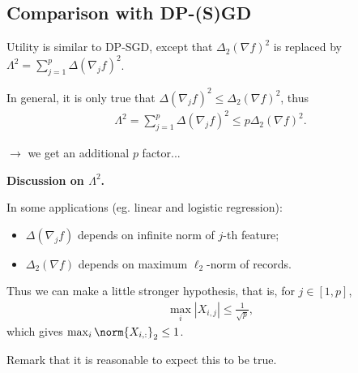 \documentclass[notheorems]{beamer}
\begin{document}
\subsection{Comparison with DP-(S)GD}
\begin{frame}
  Utility is similar to DP-SGD, except that $\Delta_2(\nabla f)^2$ is replaced by $\Lambda^2 = \sum_{j=1}^p \Delta(\nabla_j f)^2$.

  \vspace{1em}

  In general, it is only true that $\Delta(\nabla_j f)^2 \le \Delta_2(\nabla f)^2$, thus
  \begin{align*}
    \Lambda^2 = \sum_{j=1}^p \Delta(\nabla_j f)^2 \le p \Delta_2(\nabla f)^2.
  \end{align*}

  \quad $\rightarrow$ we get an additional $p$ factor...
\end{frame}

\begin{frame}
  \textbf{Discussion on $\Lambda^2$.}

  In some applications (eg. linear and logistic regression):
  \begin{itemize}
  \item $\Delta(\nabla_j f)$ depends on infinite norm of $j$-th feature;
  \item $\Delta_2(\nabla f)$ depends on maximum $\ell_2$-norm of records.
  \end{itemize}

  \vspace{1em}

  Thus we can make a little stronger hypothesis, that is, for $j \in [1, p]$,
  \begin{align*}
    \max_{i} |X_{i,j}| \le \frac{1}{\sqrt{p}},
  \end{align*}
  which gives $\max_{i} \norm{X_{i,:}}_2 \le 1$.

  Remark that it is reasonable to expect this to be true.
\end{frame}
\end{document}

